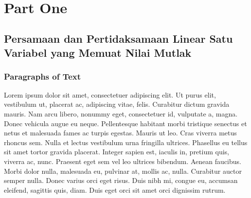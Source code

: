\documentclass[11pt,fleqn]{book} %
\begin{document}


\pagestyle{empty} %

\tableofcontents %

\cleardoublepage %

\pagestyle{fancy} %


\part{Part One}



\chapter{Persamaan dan Pertidaksamaan Linear Satu Variabel yang Memuat Nilai Mutlak}

\section{Paragraphs of Text}

Lorem ipsum dolor sit amet, consectetuer adipiscing elit. Ut purus elit, vestibulum ut, placerat ac, adipiscing vitae, felis. Curabitur dictum gravida mauris. Nam arcu libero, nonummy eget, consectetuer id, vulputate a, magna. Donec vehicula augue eu neque. Pellentesque habitant morbi tristique senectus et netus et malesuada fames ac turpis egestas. Mauris ut leo. Cras viverra metus rhoncus sem. Nulla et lectus vestibulum urna fringilla ultrices. Phasellus eu tellus sit amet tortor gravida placerat. Integer sapien est, iaculis in, pretium quis, viverra ac, nunc. Praesent eget sem vel leo ultrices bibendum. Aenean faucibus. Morbi dolor nulla, malesuada eu, pulvinar at, mollis ac, nulla. Curabitur auctor semper nulla. Donec varius orci eget risus. Duis nibh mi, congue eu, accumsan eleifend, sagittis quis, diam. Duis eget orci sit amet orci dignissim rutrum.
\end{document}
